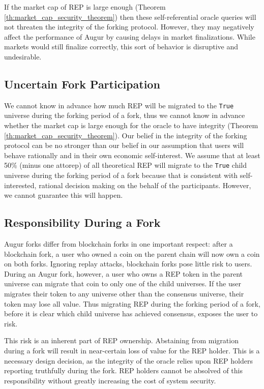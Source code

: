 \documentclass[floatfix,reprint,nofootinbib,amsmath,amssymb,epsfig,pre,floats,letterpaper,groupedaffiliation]{revtex4-1}
\theoremstyle{definition}
\theoremstyle{definition}
\begin{document}
If the market cap of REP is large enough (Theorem \ref{th:market_cap_security_theorem}) then these self-referential oracle queries will not threaten the integrity of the forking protocol.  However, they may negatively affect the performance of Augur by causing delays in market finalizations.  While markets would still finalize correctly, this sort of behavior is disruptive and undesirable.

\subsection{Uncertain Fork Participation}\label{subsection:uncertain_fork_participation}

We cannot know in advance how much REP will be migrated to the \texttt{True} universe during the forking period of a fork, thus we cannot know in advance whether the market cap is large enough for the oracle to have integrity (Theorem \ref{th:market_cap_security_theorem}).  Our belief in the integrity of the forking protocol can be no stronger than our belief in our assumption that users will behave rationally and in their own economic self-interest. We assume that at least 50\% (minus one attorep) of all theoretical REP will migrate to the \texttt{True} child universe during the forking period of a fork because that is consistent with self-interested, rational decision making on the behalf of the participants. However, we cannot guarantee this will happen.

\subsection{Responsibility During a Fork}
Augur forks differ from blockchain forks in one important respect: after a blockchain fork, a user who owned a coin on the parent chain will now own a coin on both forks.  Ignoring replay attacks, blockchain forks pose little risk to users.  During an Augur fork, however, a user who owns a REP token in the parent universe can migrate that coin to only one of the child universes.  If the user migrates their token to any universe other than the consensus universe, their token may lose all value.  Thus migrating REP during the forking period of a fork, before it is clear which child universe has achieved consensus, exposes the user to risk.

This risk is an inherent part of REP ownership. Abstaining from migration during a fork will result in near-certain loss of value for the REP holder. This is a necessary design decision, as the integrity of the oracle relies upon REP holders reporting truthfully during the fork. REP holders cannot be absolved of this responsibility without greatly increasing the cost of system security.
\end{document}
